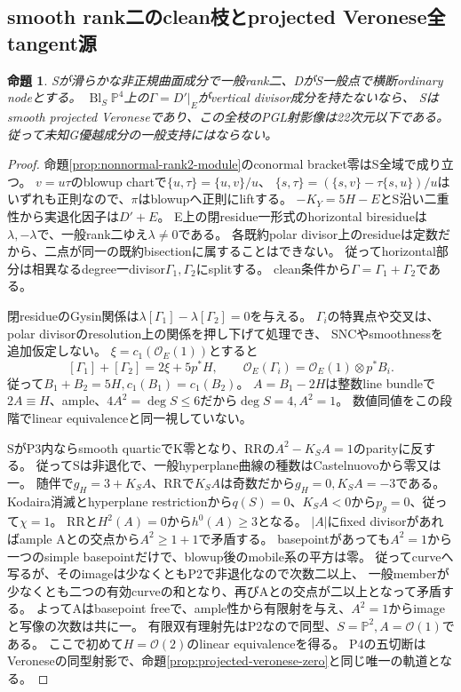 \documentclass[a4paper,11pt]{ltjsarticle}
\newtheorem{proposition}{命題}[section]
\theoremstyle{definition}
\begin{document}
\subsection{smooth rank二のclean枝とprojected Veronese全tangent源}
\begin{proposition}\label{prop:clean-rank2-PV-bound}
Sが滑らかな非正規曲面成分で一般rank二、DがS一般点で横断ordinary nodeとする。
$\operatorname{Bl}_S\mathbb P^4$上の$\Gamma=D'|_E$がvertical divisor成分を持たないなら、
Sはsmooth projected Veroneseであり、この全枝のPGL射影像は22次元以下である。
従って未知G優越成分の一般支持にはならない。
\end{proposition}
\begin{proof}
命題\ref{prop:nonnormal-rank2-module}のconormal bracket零はS全域で成り立つ。
$v=u\tau$のblowup chartで$\{u,\tau\}=\{u,v\}/u$、
$\{s,\tau\}=(\{s,v\}-\tau\{s,u\})/u$はいずれも正則なので、$\pi$はblowupへ正則にliftする。
$-K_Y=5H-E$とS沿い二重性から実退化因子は$D'+E$。
E上の閉residue一形式のhorizontal biresidueは$\lambda,-\lambda$で、一般rank二ゆえ$\lambda\ne0$である。
各既約polar divisor上のresidueは定数だから、二点が同一の既約bisectionに属することはできない。
従ってhorizontal部分は相異なるdegree一divisor$\Gamma_1,\Gamma_2$にsplitする。
clean条件から$\Gamma=\Gamma_1+\Gamma_2$である。

閉residueのGysin関係は$\lambda[\Gamma_1]-\lambda[\Gamma_2]=0$を与える。
$\Gamma_i$の特異点や交叉は、polar divisorのresolution上の関係を押し下げて処理でき、
SNCやsmoothnessを追加仮定しない。
$\xi=c_1(\mathcal O_E(1))$とすると
\[
 [\Gamma_1]+[\Gamma_2]=2\xi+5p^*H,\qquad
 \mathcal O_E(\Gamma_i)=\mathcal O_E(1)\otimes p^*B_i.
\]
従って$B_1+B_2=5H,c_1(B_1)=c_1(B_2)$。
$A=B_1-2H$は整数line bundleで$2A\equiv H$、ample、$4A^2=\deg S\le6$だから$\deg S=4,A^2=1$。
数値同値をこの段階でlinear equivalenceと同一視していない。

SがP3内ならsmooth quarticでK零となり、RRの$A^2-K_SA=1$のparityに反する。
従ってSは非退化で、一般hyperplane曲線の種数はCastelnuovoから零又は一。
随伴で$g_H=3+K_SA$、RRで$K_SA$は奇数だから$g_H=0,K_SA=-3$である。
Kodaira消滅とhyperplane restrictionから$q(S)=0$、$K_SA<0$から$p_g=0$、従って$\chi=1$。
RRと$H^2(A)=0$から$h^0(A)\ge3$となる。
$|A|$にfixed divisorがあればample Aとの交点から$A^2\ge1+1$で矛盾する。
basepointがあっても$A^2=1$から一つのsimple basepointだけで、blowup後のmobile系の平方は零。
従ってcurveへ写るが、そのimageは少なくともP2で非退化なので次数二以上、
一般memberが少なくとも二つの有効curveの和となり、再びAとの交点が二以上となって矛盾する。
よってAはbasepoint freeで、ample性から有限射を与え、$A^2=1$からimageと写像の次数は共に一。
有限双有理射先はP2なので同型、$S=\mathbb P^2,A=\mathcal O(1)$である。
ここで初めて$H=\mathcal O(2)$のlinear equivalenceを得る。
P4の五切断はVeroneseの同型射影で、命題\ref{prop:projected-veronese-zero}と同じ唯一の軌道となる。


\end{proof}
\end{document}

